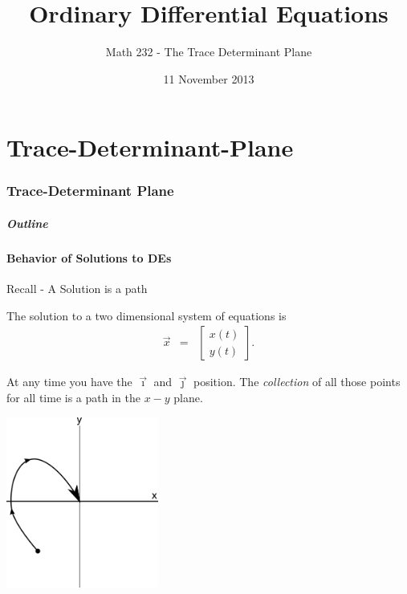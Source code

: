 \part{Trace-Determinant-Plane}
\section{Trace-Determinant Plane}


\title{Ordinary Differential Equations}
\subtitle{Math 232 - The Trace Determinant Plane}
\date{11 November 2013}

\begin{frame}
  \titlepage
\end{frame}

\begin{frame}
  \frametitle{Outline}
  \tableofcontents[ currentsection ]
\end{frame}


\subsection{Behavior of Solutions to DEs}


\begin{frame}{Recall - A Solution is a path}

  The solution to a two dimensional system of equations is 
  \begin{eqnarray*}
    \vec{x} & = & \left[
      \begin{array}{r}
        x(t) \\ y(t)
      \end{array}
      \right].
  \end{eqnarray*}

  At any time you have the $\vec{\imath}$ and $\vec{\jmath}$
  position. The \textit{collection} of all those points for all time
  is a path in the $x-y$ plane.

  \vfill

  \centerline{\includegraphics[width=5cm]{img/oneSystemSolution}}

  \vfill
  
\end{frame}

